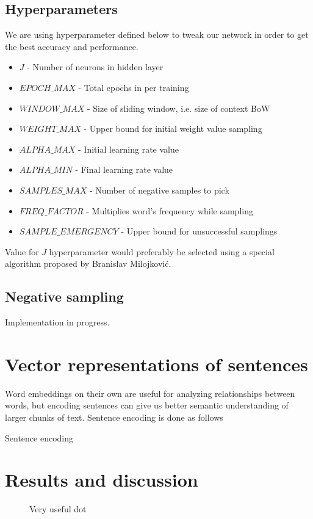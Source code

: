 \documentclass{article}
\newcommand{\SetAlgoStyle}{
	\SetAlgoNoLine
	\SetAlgoNoEnd
	\DontPrintSemicolon
}
\newcommand{\fig}[2]{
	\begin{figure}[!htb]
		\center{\texttt{[image: res/\#1]}}
		\caption{\label{fig:caption} #2}
	\end{figure}
}
\begin{document}
\subsection{Hyperparameters}

We are using hyperparameter defined below to tweak our network in order to get the best accuracy and performance.

\begin{itemize}
	\item $J$ - Number of neurons in hidden layer
	\item $EPOCH\_MAX$ - Total epochs in per training
	\item $WINDOW\_MAX$ - Size of sliding window, i.e. size of context BoW
	\item $WEIGHT\_MAX$ - Upper bound for initial weight value sampling
	\item $ALPHA\_MAX$ - Initial learning rate value
	\item $ALPHA\_MIN$ - Final learning rate value
	\item $SAMPLES\_MAX$ - Number of negative samples to pick
	\item $FREQ\_FACTOR$ - Multiplies word's frequency while sampling
	\item $SAMPLE\_EMERGENCY$ - Upper bound for unsuccessful samplings
\end{itemize}

\medbreak

Value for $J$ hyperparameter would preferably be selected using a
special algorithm proposed by Branislav Milojković.

\subsection{Negative sampling}

Implementation in progress.

\section{Vector representations of sentences}

Word embeddings on their own are useful for analyzing relationships between
words, but encoding sentences can give us better semantic understanding of
larger chunks of text. Sentence encoding is done as follows

\begin{algorithm}[H]
	\SetAlgoStyle
	\caption{Sentence encoding}
\end{algorithm}

\section{Results and discussion}

\fig{chart}{Very useful dot}
\end{document}
